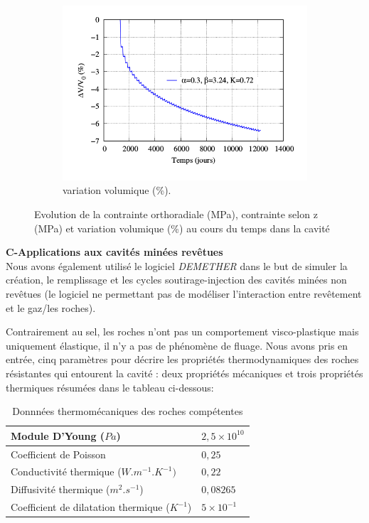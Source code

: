\documentclass[11pt,french,a4paper]{article}
\begin{document}
\begin{figure}[h!]
\begin{subfigure}[b]{0.3\linewidth}
    \includegraphics[width=\linewidth]{image/chap2/Volume1.png}
    \caption{variation volumique (\%).}
\end{subfigure}

\caption{Evolution de la  contrainte orthoradiale (MPa), contrainte selon z (MPa) et variation volumique (\%) au cours du temps dans la cavité}
\label{fig:7 figures}
\end{figure}

\textbf{C-Applications aux cavités minées revêtues}\\

Nous avons également utilisé le logiciel \emph{DEMETHER} dans le but de simuler la création, le remplissage et les cycles soutirage-injection des cavités minées non revêtues (le logiciel ne permettant pas de modéliser l’interaction entre revêtement et le gaz/les roches).

Contrairement au sel, les roches n’ont pas un comportement visco-plastique mais uniquement élastique, il n’y a pas de phénomène de fluage. Nous avons pris en entrée, cinq paramètres pour décrire les propriétés thermodynamiques des roches résistantes qui entourent la cavité : deux propriétés mécaniques et trois propriétés thermiques résumées dans le tableau ci-dessous:\\


\begin{table}[h]
\centering
\begin{tabular}{|l|l|}
\hline
Module D'Young ($Pa$) & $2,5\times 10^{10}$ \\
\hline
Coefficient de Poisson & $0,25$ \\
\hline
Conductivité thermique ($W.m^{-1}.K^{-1})$ & $0,22$ \\
\hline
Diffusivité thermique ($m^2.s^{-1}$) & $0,08265$ \\
\hline
Coefficient de dilatation thermique ($K^{-1}$) & $5\times 10^{-1}$ \\
\hline
\end{tabular}
\caption{Donnnées thermomécaniques des roches compétentes}
\end{table}
\end{document}
